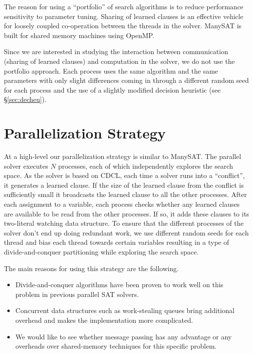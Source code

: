 \documentclass[letterpaper, compsoc, conference]{IEEEtran}
\begin{document}
The reason for using a ``portfolio'' of search algorithms is to reduce
performance sensitivity to parameter tuning. Sharing of learned clauses is an
effective vehicle for loosely coupled co-operation between the threads in the
solver. ManySAT is built for shared memory machines using OpenMP.

Since we are interested in studying the interaction between communication
(sharing of learned clauses) and computation in the solver, we do not use the
portfolio approach. Each process uses the same algorithm and the same
parameters with only slight differences coming in through a different random
seed for each process and the use of a slightly modified decision heuristic
(see \S\ref{sec:decheu}).

\section{Parallelization Strategy}
\label{sec:strategy}

At a high-level our parallelization strategy is similar to ManySAT. The
parallel solver executes $N$ processes, each of which independently explores
the search space. As the solver is based on CDCL, each time a solver runs into
a ``conflict'', it generates a learned clause. If the size of the learned
clause from the conflict is sufficiently small it broadcasts the learned clause
to all the other processes.  After each assignment to a variable, each process
checks whether any learned clauses are available to be read from the other
processes.  If so, it adds these clauses to its two-literal watching data
structure. To ensure that the different processes of the solver don't end up
doing redundant work, we use different random seeds for each thread and bias
each thread towards certain variables resulting in a type of divide-and-conquer
partitioning while exploring the search space.

The main reasons for using this strategy are the following.
\begin{itemize}
\item Divide-and-conquer algorithms have been proven to work well on this
problem in previous parallel SAT solvers.
\item Concurrent data structures such as work-stealing queues bring additional
overhead and makes the implementation more complicated.
\item We would like to see whether message passing has any advantage or
any overheads over shared-memory techniques for this specific problem.
\end{itemize} 
\end{document}
